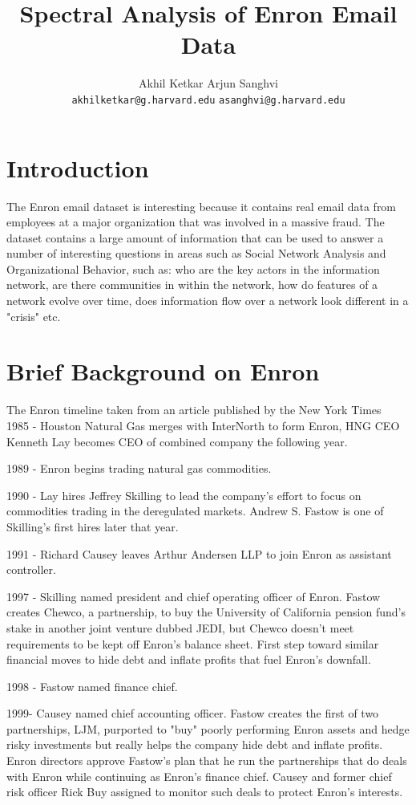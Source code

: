 \documentclass[12pt]{article}
\author{Akhil Ketkar Arjun Sanghvi \\
	\texttt{akhilketkar@g.harvard.edu} \texttt{asanghvi@g.harvard.edu}}
\title{Spectral Analysis of Enron Email Data}
\begin{document}
\maketitle
\section{Introduction} \indent The Enron email dataset is interesting because it contains real email data from employees at a major organization that was involved in a massive fraud. The dataset contains a large amount of information that can be used to answer a number of interesting questions in areas such as Social Network Analysis and Organizational Behavior, such as: who are the key actors in the information network, are there communities in within the network, how do features of a network evolve over time, does information flow over a network look different in a "crisis" etc. 

\section{Brief Background on Enron}
	The Enron timeline taken from an article published by the New York Times \cite{nyt} \\
	
	1985 - Houston Natural Gas merges with InterNorth to form Enron, HNG CEO Kenneth Lay becomes CEO of combined company the following year.

1989 - Enron begins trading natural gas commodities.

1990 - Lay hires Jeffrey Skilling to lead the company's effort to focus on commodities trading in the deregulated markets. Andrew S. Fastow is one of Skilling's first hires later that year.

1991 - Richard Causey leaves Arthur Andersen LLP to join Enron as assistant controller.

1997 - Skilling named president and chief operating officer of Enron. Fastow creates Chewco, a partnership, to buy the University of California pension fund's stake in another joint venture dubbed JEDI, but Chewco doesn't meet requirements to be kept off Enron's balance sheet. First step toward similar financial moves to hide debt and inflate profits that fuel Enron's downfall.

1998 - Fastow named finance chief.

1999- Causey named chief accounting officer. Fastow creates the first of two partnerships, LJM, purported to "buy" poorly performing Enron assets and hedge risky investments but really helps the company hide debt and inflate profits. Enron directors approve Fastow's plan that he run the partnerships that do deals with Enron while continuing as Enron's finance chief. Causey and former chief risk officer Rick Buy assigned to monitor such deals to protect Enron's interests.
\end{document}
